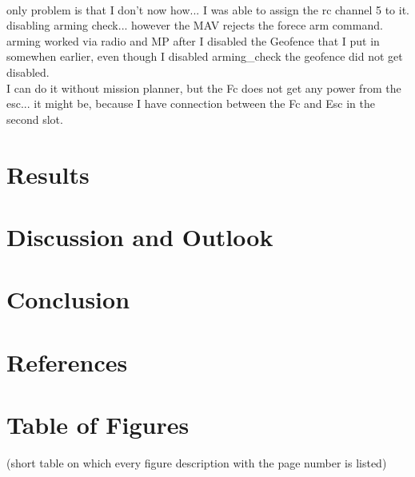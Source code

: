 \documentclass{article}
\begin{document}
	\\ only problem is that I don't now how... I was able to assign the rc channel 5 to it. 
	\\ disabling arming check... however the MAV rejects the forece arm command. 
	\\ arming worked via radio and MP after I disabled the Geofence that I put in somewhen earlier, even though I disabled arming\_check the geofence did not get disabled.
	\\ I can do it without mission planner, but the Fc does not get any power from the esc... it might be, because I have connection between the Fc and Esc in the second slot. 

	
	
	
	\section{Results}
	\section{Discussion and Outlook}
	\section{Conclusion}
	
	\section{References}
	\printbibliography[
	heading=bibintoc,
	title={Bibliography}
	]	
	\section{Table of Figures}
	(short table on which every figure description with the page number is listed)
\end{document}
